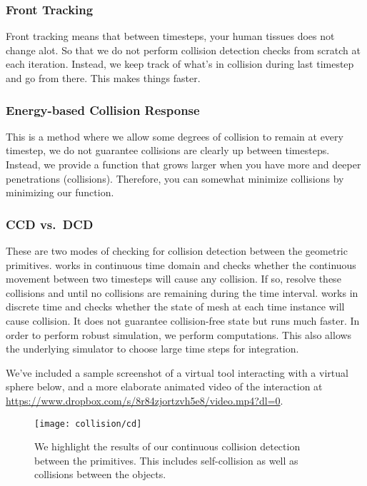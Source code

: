 \subsubsection{Front Tracking}\label{sssec:front_tracking}
Front tracking means that between timesteps, your human tissues does not change alot. So that we do not perform collision detection checks from scratch at each iteration. Instead, we keep track of what's in collision during last timestep and go from there. This makes things faster.

\subsubsection{Energy-based Collision Response}\label{sssec:energy_based_response}
This is a method where we allow some degrees of collision to remain at every timestep, \ie we do not guarantee collisions are clearly up between timesteps. Instead, we provide a function that grows larger when you have more and deeper penetrations (collisions). Therefore, you can somewhat minimize collisions by minimizing our function.

\subsubsection{CCD vs.\ DCD}\label{sssec:ccd_vs_dcd}
These are two modes of checking for collision detection between the geometric primitives.  works in continuous time domain and checks whether the continuous movement between two timesteps will cause any  collision. If so, resolve these collisions and  until no collisions are remaining during the time interval.  works in discrete time and checks whether the state of mesh at each time instance will cause collision. It does not guarantee collision-free state but runs much faster. In order to perform robust simulation, we perform  computations. This also allows the underlying simulator to choose large time steps for integration.

We've included a sample screenshot of a virtual tool interacting with a virtual sphere below, and a more elaborate animated video of the interaction at \url{https://www.dropbox.com/s/8r84zjortzvh5e8/video.mp4?dl=0}.

\begin{figure}
  \centering%
	\texttt{[image: collision/cd]}
	\caption{We highlight the results of our continuous collision detection between the primitives. This includes self-collision as well as collisions between the objects.}\label{fig:cd}
\end{figure}

